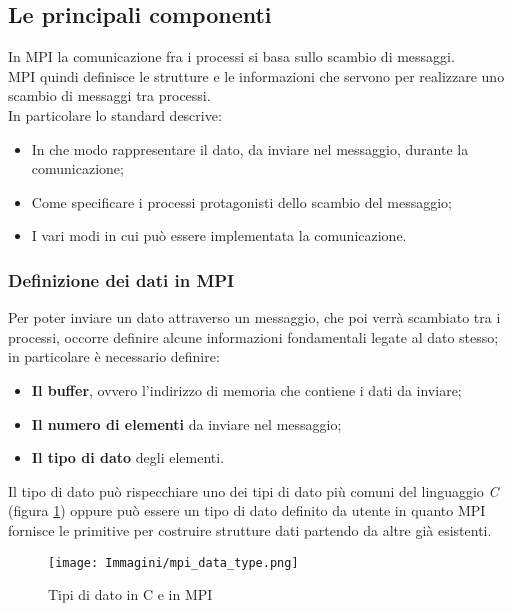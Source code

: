 \subsection{Le principali componenti}\label{subsec:comm_mpi}
In MPI la comunicazione fra i processi si basa sullo scambio di messaggi.\\
MPI quindi definisce le strutture e le informazioni che servono per realizzare uno scambio di messaggi tra processi.\\
In particolare lo standard descrive:
\begin{itemize}
	\item In che modo rappresentare il dato, da inviare nel messaggio, durante la comunicazione;
	\item Come specificare i processi protagonisti dello scambio del messaggio;
	\item I vari modi in cui può essere implementata la comunicazione.
\end{itemize}  
\subsubsection{Definizione dei dati in MPI}\label{subsec:def_dati_mpi}
Per poter inviare un dato attraverso un messaggio, che poi verrà scambiato tra i processi, occorre definire alcune informazioni fondamentali legate al dato stesso; in particolare è necessario definire:
\begin{itemize}
	\item \textbf{Il buffer}, ovvero l'indirizzo di memoria che contiene i dati da inviare;
	\item \textbf{Il numero di elementi} da inviare nel messaggio;
	\item \textbf{Il tipo di dato} degli elementi.
\end{itemize}
Il tipo di dato può rispecchiare uno dei tipi di dato più comuni del linguaggio \textit{C} (figura \ref{fig:mpi_data_types}) oppure può essere un tipo di dato definito da utente in quanto MPI fornisce le primitive per costruire strutture dati partendo da altre già esistenti.
\begin{figure}[H]
	\centering
	\texttt{[image: Immagini/mpi\_data\_type.png]}
	\caption{Tipi di dato in C e in MPI}
	\label{fig:mpi_data_types}
\end{figure}
